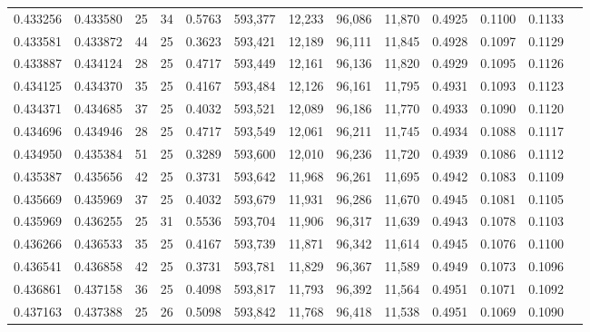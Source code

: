 \begin{tabular}{rrrrrrrrrrrrr}
0.433256 & 0.433580 &    25 &  34 &                                     0.5763 & 593,377 &  12,233 &  96,086 &  11,870 & 0.4925 & 0.1100 & 0.1133 \\
0.433581 & 0.433872 &    44 &  25 &                                     0.3623 & 593,421 &  12,189 &  96,111 &  11,845 & 0.4928 & 0.1097 & 0.1129 \\
0.433887 & 0.434124 &    28 &  25 &                                     0.4717 & 593,449 &  12,161 &  96,136 &  11,820 & 0.4929 & 0.1095 & 0.1126 \\
0.434125 & 0.434370 &    35 &  25 &                                     0.4167 & 593,484 &  12,126 &  96,161 &  11,795 & 0.4931 & 0.1093 & 0.1123 \\
0.434371 & 0.434685 &    37 &  25 &                                     0.4032 & 593,521 &  12,089 &  96,186 &  11,770 & 0.4933 & 0.1090 & 0.1120 \\
0.434696 & 0.434946 &    28 &  25 &                                     0.4717 & 593,549 &  12,061 &  96,211 &  11,745 & 0.4934 & 0.1088 & 0.1117 \\
0.434950 & 0.435384 &    51 &  25 &                                     0.3289 & 593,600 &  12,010 &  96,236 &  11,720 & 0.4939 & 0.1086 & 0.1112 \\
0.435387 & 0.435656 &    42 &  25 &                                     0.3731 & 593,642 &  11,968 &  96,261 &  11,695 & 0.4942 & 0.1083 & 0.1109 \\
0.435669 & 0.435969 &    37 &  25 &                                     0.4032 & 593,679 &  11,931 &  96,286 &  11,670 & 0.4945 & 0.1081 & 0.1105 \\
0.435969 & 0.436255 &    25 &  31 &                                     0.5536 & 593,704 &  11,906 &  96,317 &  11,639 & 0.4943 & 0.1078 & 0.1103 \\
0.436266 & 0.436533 &    35 &  25 &                                     0.4167 & 593,739 &  11,871 &  96,342 &  11,614 & 0.4945 & 0.1076 & 0.1100 \\
0.436541 & 0.436858 &    42 &  25 &                                     0.3731 & 593,781 &  11,829 &  96,367 &  11,589 & 0.4949 & 0.1073 & 0.1096 \\
0.436861 & 0.437158 &    36 &  25 &                                     0.4098 & 593,817 &  11,793 &  96,392 &  11,564 & 0.4951 & 0.1071 & 0.1092 \\
0.437163 & 0.437388 &    25 &  26 &                                     0.5098 & 593,842 &  11,768 &  96,418 &  11,538 & 0.4951 & 0.1069 & 0.1090 \\

\end{tabular}

